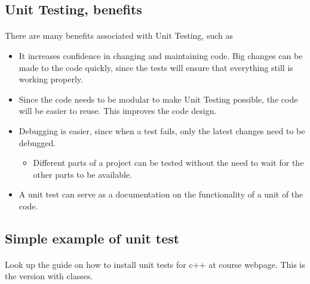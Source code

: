 \documentclass[%
oneside,                 %
final,                   %
10pt]{article}
\begin{document}
\subsection*{Unit Testing, benefits}

\paragraph{}
There are many benefits associated with Unit Testing, such as
\begin{itemize}
  \item It increases confidence in changing and maintaining code. Big changes can be made to the code quickly, since the tests will ensure that everything still is working properly.

  \item Since the code needs to be modular to make Unit Testing possible, the code will be easier to reuse. This improves the code design.

  \item Debugging is easier, since when a test fails, only the latest changes need to be debugged.
\begin{itemize}

   \item Different parts of a project can be tested without the need to wait for the other parts to be available.

\end{itemize}

\noindent
  \item A unit test can serve as a documentation on the functionality of a unit of the code.
\end{itemize}

\noindent



\subsection*{Simple example of unit test}

\paragraph{}
Look up the guide on how to install unit tests for c++ at course webpage. This is the version with classes.
\end{document}
